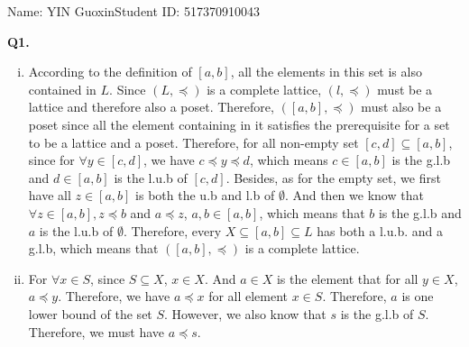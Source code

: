 \documentclass{article}[12pt]
\begin{document}
\noindent

\noindent{}
\begin{center}
\footnotesize{\quad Name: YIN Guoxin\quad Student ID: 517370910043}


\end{center}

\noindent \textbf{Q1.}
\begin{enumerate}[(i)]
\item According to the definition of $[a,b]$, all the elements in this set is also contained in $L$. Since $(L,\preceq)$ is a complete lattice, $(l,\preceq)$ must be a lattice and therefore also a poset. Therefore, $([a,b],\preceq )$ must also be a poset since all the element containing in it satisfies the prerequisite for a set to be a lattice and a poset. Therefore, for all non-empty set $[c,d]\subseteq [a,b]$, since for $\forall y\in [c,d]$, we have $c\preceq y\preceq d$, which means $c\in [a,b]$ is the g.l.b and $d\in [a,b]$ is the l.u.b of $[c,d]$. Besides, as for the empty set, we first have all $z\in [a,b]$ is both the u.b and l.b of $\emptyset$. And then we know that $\forall z\in [a,b], z\preceq b$ and $a\preceq z$, $a,b\in [a,b]$, which means that $b$ is the g.l.b and $a$ is the l.u.b of $\emptyset$. Therefore, every $X\subseteq [a,b]\subseteq L$ has both a l.u.b. and a g.l.b, which means that $([a,b],\preceq )$ is a complete lattice.
\item For $\forall x\in S$, since $S\subseteq X$, $x\in X$. And $a\in X$ is the element that for all $y\in X$, $a\preceq y$. Therefore, we have $a\preceq x$ for all element $x\in S$. Therefore, $a$ is one lower bound of the set $S$. However, we also know that $s$ is the g.l.b of $S$. Therefore, we must have $a\preceq s$.

\end{enumerate}
\end{document}
